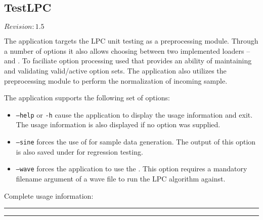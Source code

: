 \subsection{TestLPC}

$Revision: 1.5 $

The  application targets
the LPC unit testing as a preprocessing module.
Through a number of options it also allows choosing
between two implemented loaders -- 
and . To faciliate option processing
 used that provides
an ability of maintaining and validating valid/active
option sets. The application also utilizes the 
preprocessing module to perform the normalization of
incoming sample.

The application supports the following set of options:

\begin{itemize}
\item
\texttt{--help} or \texttt{-h} cause the application to
display the usage information and exit. The usage information
is also displayed if no option was supplied.

\item
\texttt{--sine} forces the use of  for
sample data generation. The output of this option is also
saved under  for regression testing.

\item
\texttt{--wave} forces the application to use the .
This option requires a mandatory filename argument of a wave file
to run the LPC algorithm against.
\end{itemize}

\noindent
Complete usage information:

\vspace{15pt}
\hrule

\hrule
\vspace{15pt}

